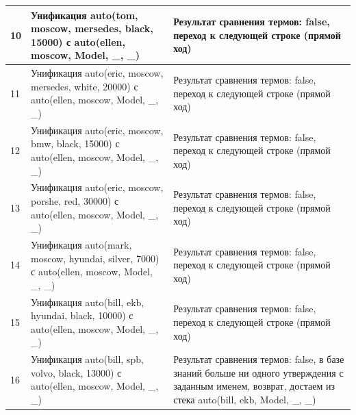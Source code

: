 \documentclass[a4paper,14pt]{extreport} %
\begin{document}
\begin{enumerate}
\begin{longtable}{|p{1.1cm}|p{8.5cm}|p{7cm}|}
	10 & Унификация auto(tom, moscow, mersedes, black, 15000) с auto(ellen, moscow, Model, \_, \_) & Результат сравнения термов: false, переход к следующей строке (прямой ход) \\ \hline
	11 & Унификация auto(eric, moscow, mersedes, white, 20000) с auto(ellen, moscow, Model, \_, \_) & Результат сравнения термов: false, переход к следующей строке (прямой ход) \\ \hline
	12 & Унификация auto(eric, moscow, bmw, black, 15000) с auto(ellen, moscow, Model, \_, \_) & Результат сравнения термов: false, переход к следующей строке (прямой ход) \\ \hline
	13 & Унификация auto(eric, moscow, porshe, red, 30000) с auto(ellen, moscow, Model, \_, \_) & Результат сравнения термов: false, переход к следующей строке (прямой ход) \\ \hline
	14 & Унификация auto(mark, moscow, hyundai, silver, 7000) с auto(ellen, moscow, Model, \_, \_) & Результат сравнения термов: false, переход к следующей строке (прямой ход) \\ \hline
	15 & Унификация auto(bill, ekb, hyundai, black, 10000) с auto(ellen, moscow, Model, \_, \_) & Результат сравнения термов: false, переход к следующей строке (прямой ход) \\ \hline
	16 & Унификация auto(bill, spb, volvo, black, 13000) с auto(ellen, moscow, Model, \_, \_) & Результат сравнения термов: false, в базе знаний больше ни одного утверждения с заданным именем, возврат, достаем из стека auto(bill, ekb, Model, \_, \_) \\ \hline


\end{longtable}
\end{enumerate}
\end{document}
